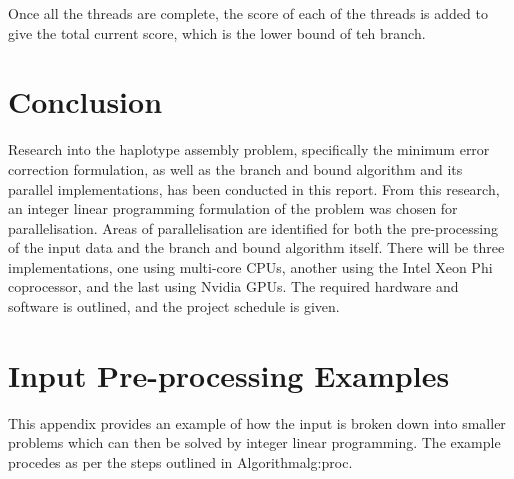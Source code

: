 \documentclass[10pt,twocolumn]{article}
\begin{document}
Once all the threads are complete, the score of each of the threads is added to give the total current score,
which is the lower bound of teh branch.

\section{Conclusion} \label{sec:conc}

Research into the haplotype assembly problem, specifically the minimum error correction formulation, as well
as the branch and bound algorithm and its parallel implementations, has been conducted in this report. From
this research, an integer linear programming formulation of the problem was chosen for parallelisation.
Areas of parallelisation are identified for both the pre-processing of the input data and the branch and bound
algorithm itself. There will be three implementations, one using multi-core CPUs, another using the Intel Xeon
Phi coprocessor, and the last using Nvidia GPUs. The required hardware and software is outlined, and the 
project schedule is given. 




\clearpage 

\appendix

\section{Input Pre-processing Examples } \label{app:inpre}

This appendix provides an example of how the input is broken down into smaller problems which can then be 
solved by integer linear programming. The example procedes as per the steps outlined in Algorithm{alg:proc}.
\end{document}
